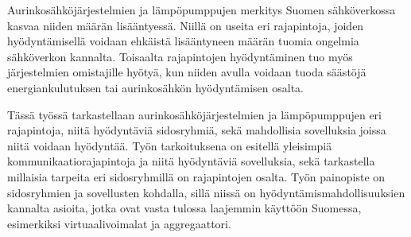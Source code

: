 Aurinkosähköjärjestelmien ja lämpöpumppujen merkitys Suomen sähköverkossa kasvaa niiden määrän lisääntyessä. Niillä on useita eri rajapintoja, joiden hyödyntämisellä voidaan ehkäistä lisääntyneen määrän tuomia ongelmia sähköverkon kannalta. Toisaalta rajapintojen hyödyntäminen tuo myös järjestelmien omistajille hyötyä, kun niiden avulla voidaan tuoda säästöjä energiankulutuksen tai aurinkosähkön hyödyntämisen osalta.

Tässä työssä tarkastellaan aurinkosähköjärjestelmien ja lämpöpumppujen eri rajapintoja, niitä hyödyntäviä sidosryhmiä, sekä mahdollisia sovelluksia joissa niitä voidaan hyödyntää. Työn tarkoituksena on esitellä yleisimpiä kommunikaatiorajapintoja ja niitä hyödyntäviä sovelluksia, sekä tarkastella millaisia tarpeita eri sidosryhmillä on rajapintojen osalta. Työn painopiste on sidosryhmien ja sovellusten kohdalla, sillä niissä on hyödyntämismahdollisuuksien kannalta asioita, jotka ovat vasta tulossa laajemmin käyttöön Suomessa, esimerkiksi virtuaalivoimalat ja aggregaattori. 